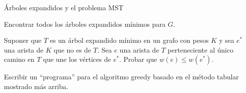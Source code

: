 \begin{section}{Árboles expandidos y el problema MST}
\begin{enumex}
Encontrar todos los árboles expandidos mínimos para $G$.

\item Suponer que $T$ es un árbol expandido mínimo en un grafo con pesos $K$ y sea $e^*$ una arista de $K$ que no es de $T$. Sea $e$ una arista de $T$ perteneciente al único camino en $T$ que une los vértices de $e^*$. Probar que $w(e) \le w(e^*)$. 

\item Escribir un ``programa'' para el algoritmo greedy basado en el
método ta\-bu\-lar mostrado más arriba.
\end{enumex}


\end{section}
